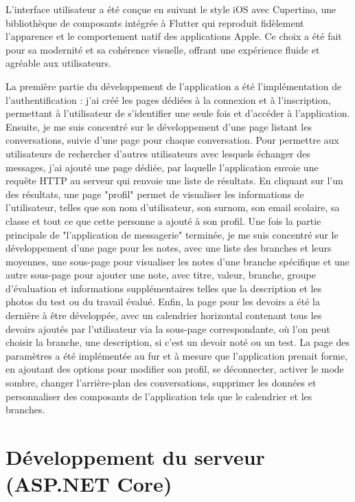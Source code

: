 \documentclass[12pt]{report}
\begin{document}
	L'interface utilisateur a été conçue en suivant le style iOS avec Cupertino, une bibliothèque de composants intégrée à Flutter qui reproduit fidèlement l'apparence et le comportement natif des applications Apple. Ce choix a été fait pour sa modernité et sa cohérence visuelle, offrant une expérience fluide et agréable aux utilisateurs.
	
	La première partie du développement de l'application a été l'implémentation de l'authentification : j'ai créé les pages dédiées à la connexion et à l'inscription, permettant à l'utilisateur de s'identifier une seule fois et d'accéder à l'application. Ensuite, je me suis concentré sur le développement d'une page listant les conversations, suivie d'une page pour chaque conversation. 
	Pour permettre aux utilisateurs de rechercher d'autres utilisateurs avec lesquels échanger des messages, j'ai ajouté une page dédiée, par laquelle l'application envoie une requête HTTP\supercite{http} au serveur qui renvoie une liste de résultats. En cliquant sur l'un des résultats, une page "profil" permet de visualiser les informations de l'utilisateur, telles que son nom d'utilisateur, son surnom, son email scolaire, sa classe et tout ce que cette personne a ajouté à son profil. 
	Une fois la partie principale de "l'application de messagerie" terminée, je me suis concentré sur le développement d'une page pour les notes, avec une liste des branches et leurs moyennes, une sous-page pour visualiser les notes d'une branche spécifique et une autre sous-page pour ajouter une note, avec titre, valeur, branche, groupe d'évaluation et informations supplémentaires telles que la description et les photos du test ou du travail évalué. 
	Enfin, la page pour les devoirs a été la dernière à être développée, avec un calendrier horizontal contenant tous les devoirs ajoutés par l'utilisateur via la sous-page correspondante, où l'on peut choisir la branche, une description, si c'est un devoir noté ou un test. 
	La page des paramètres a été implémentée au fur et à mesure que l'application prenait forme, en ajoutant des options pour modifier son profil, se déconnecter, activer le mode sombre, changer l'arrière-plan des conversations, supprimer les données et personnaliser des composants de l'application tels que le calendrier et les branches.
	
	\section{Développement du serveur (ASP.NET Core)}
	\label{serverdevelopment}
	
\end{document}

